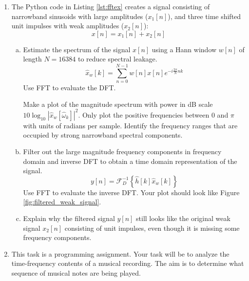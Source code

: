 \begin{enumerate}
\item The Python code in Listing \ref{lst:fftex} creates a signal consisting of narrowband sinusoids with large amplitudes ($x_1[n]$), and three time shifted unit impulses with weak amplitudes ($x_2[n]$):
  \begin{equation}
    x[n]=x_1[n]+x_2[n]
    \end{equation}

  
  
  \begin{enumerate}[a)]
  \item Estimate the spectrum of the signal $x[n]$ using a Hann window $w[n]$ of length $N=16384$ to reduce spectral leakage.
    \begin{equation}
      \hat{x}_w[k]= \sum_{n=0}^{N-1}w[n]x[n]e^{-i\frac{2\pi}{N}nk}
      \end{equation}
      Use FFT to evaluate the DFT.

    Make a plot of the magnitude spectrum with power in dB scale
    $10\log_{10}|\hat{x}_w[\hat{\omega}_k]|^2$. Only plot the positive
    frequencies between 0 and $\pi$ with units of radians per
    sample. Identify the frequency ranges that are occupied by strong
    narrowband spectral components.
    
  \item Filter out the large magnitude frequency components in
    frequency domain and inverse DFT to obtain a time domain
    representation of the signal.
    \begin{equation}
    y[n]= \mathcal{F}_D^{-1}\left\{ \hat{h}[k]\hat{x}_w[k] \right\}
    \end{equation}
    Use FFT to evaluate the inverse DFT. Your plot should look like
    Figure \ref{fig:filtered_weak_signal}.
    
    \item Explain why the filtered signal $y[n]$ still looks like the
      original weak signal $x_2[n]$ consisting of unit impulses, even
      though it is missing some frequency components.
    \end{enumerate}
    
\item
  

This task is a programming assignment. Your task will be to analyze
the time-frequency contents of a musical recording. The aim is to
determine what sequence of musical notes are being played. 


\end{enumerate}
